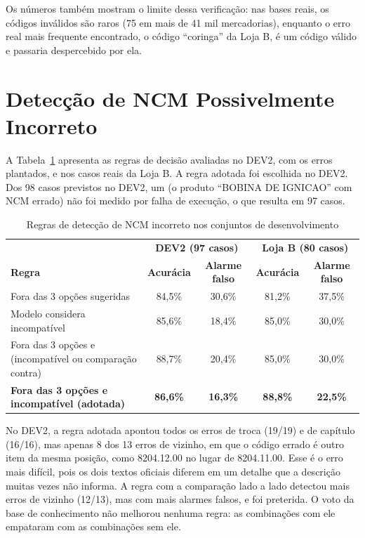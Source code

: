 Os números também mostram o limite dessa verificação: nas bases reais, os códigos inválidos são raros (75 em mais de 41 mil mercadorias), enquanto o erro real mais frequente encontrado, o código ``coringa'' da Loja B, é um código válido e passaria despercebido por ela.

\section{Detecção de NCM Possivelmente Incorreto}

A Tabela~\ref{tab:regras_deteccao} apresenta as regras de decisão avaliadas no DEV2, com os erros plantados, e nos casos reais da Loja B. A regra adotada foi escolhida no DEV2. Dos 98 casos previstos no DEV2, um (o produto ``BOBINA DE IGNICAO'' com NCM errado) não foi medido por falha de execução, o que resulta em 97 casos.

\begin{table}[H]
\centering
\caption{Regras de detecção de NCM incorreto nos conjuntos de desenvolvimento}
\label{tab:regras_deteccao}
\small
\begin{tabular}{p{5.9cm} c c c c}
\hline
 & \multicolumn{2}{c}{\textbf{DEV2 (97 casos)}} & \multicolumn{2}{c}{\textbf{Loja B (80 casos)}} \\
\textbf{Regra} & \textbf{Acurácia} & \textbf{Alarme falso} & \textbf{Acurácia} & \textbf{Alarme falso} \\
\hline
Fora das 3 opções sugeridas & 84,5\% & 30,6\% & 81,2\% & 37,5\% \\
Modelo considera incompatível & 85,6\% & 18,4\% & 85,0\% & 30,0\% \\
Fora das 3 opções e (incompatível ou comparação contra) & 88,7\% & 20,4\% & 85,0\% & 30,0\% \\
\textbf{Fora das 3 opções e incompatível (adotada)} & \textbf{86,6\%} & \textbf{16,3\%} & \textbf{88,8\%} & \textbf{22,5\%} \\
\hline
\end{tabular}
\end{table}

No DEV2, a regra adotada apontou todos os erros de troca (19/19) e de capítulo (16/16), mas apenas 8 dos 13 erros de vizinho, em que o código errado é outro item da mesma posição, como 8204.12.00 no lugar de 8204.11.00. Esse é o erro mais difícil, pois os dois textos oficiais diferem em um detalhe que a descrição muitas vezes não informa. A regra com a comparação lado a lado detectou mais erros de vizinho (12/13), mas com mais alarmes falsos, e foi preterida. O voto da base de conhecimento não melhorou nenhuma regra: as combinações com ele empataram com as combinações sem ele.

